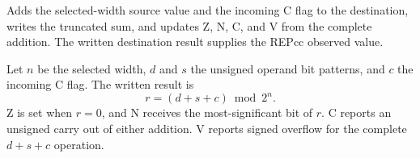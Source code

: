 Adds the selected-width source value and the incoming C flag to the destination, writes the truncated sum, and updates Z, N, C, and V from the complete addition. The written destination result supplies the REPcc observed value.

Let \(n\) be the selected width, \(d\) and \(s\) the unsigned operand bit patterns, and \(c\) the incoming C flag. The written result is
\[
  r = (d + s + c) \bmod 2^n .
\]
Z is set when \(r=0\), and N receives the most-significant bit of \(r\). C reports an unsigned carry out of either addition. V reports signed overflow for the complete \(d+s+c\) operation.

